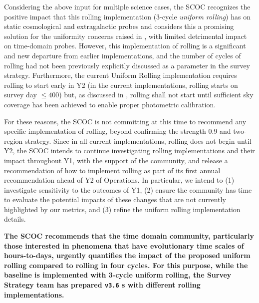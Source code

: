 Considering the above input for multiple science cases, the SCOC recognizes the positive impact that this rolling implementation (3-cycle {\it uniform rolling}) has on static cosmological and extragalactic probes and considers this a promising solution for the uniformity concerns raised in , with limited detrimental impact on time-domain probes. However, this implementation of rolling is a significant and new departure from earlier implementations, and the number of cycles of rolling had not been previously explicitly discussed as a parameter in the survey strategy. Furthermore, the current Uniform Rolling implementation requires rolling to start early in Y2 (in the current implementations, rolling starts on survey day $\leq 400$) but, as discussed in , rolling shall not start until sufficient sky coverage has been achieved to enable proper photometric calibration.%

For these reasons, the SCOC is not committing at this time to recommend any specific implementation of rolling, beyond confirming the strength 0.9 and two-region strategy. Since in all current implementations,
rolling does not begin until Y2, the SCOC intends to continue investigating rolling implementations and their impact throughout Y1, with the support of the community, and release a recommendation of how to implement rolling as part of its first annual recommendation ahead of Y2 of Operations. In particular, we intend to (1) investigate sensitivity to the outcomes of Y1, (2) ensure the community has time to evaluate the potential impacts of these changes that are not currently highlighted by our metrics, and (3) refine the uniform rolling implementation details.

{\bf The SCOC recommends that the time domain community, particularly those interested in phenomena that have evolutionary time scales of hours-to-days, urgently quantifies the impact of the proposed uniform rolling compared to rolling in four cycles. For this purpose, while the baseline is implemented with 3-cycle uniform rolling, the Survey Strategy team has prepared \texttt{v3.6} \opsim s  with different rolling implementations.}

